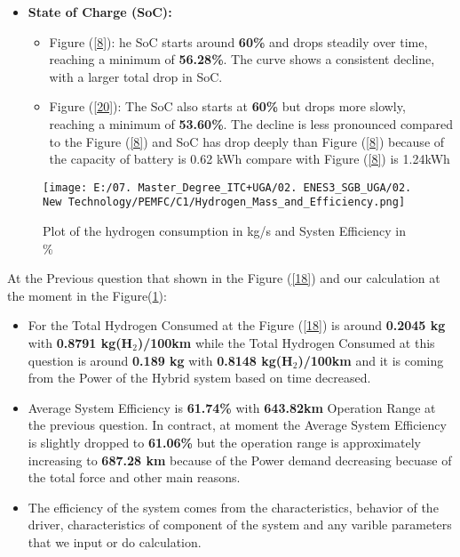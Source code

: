 \documentclass[12pt,a4paper]{article}
\numberwithin{equation}{section}
\begin{document}
\begin{itemize}
	\item \textbf{State of Charge (SoC):}
	\begin{itemize}
		\item {Figure (\ref{8}):} he SoC starts around \textbf{60\%} and drops steadily over time, reaching a minimum of \textbf{56.28\%}. The curve shows a consistent decline, with a larger total drop in SoC.
		\item {Figure (\ref{20}):} The SoC also starts at \textbf{60\%} but drops more slowly, reaching a minimum of \textbf{53.60\%}. The decline is less pronounced compared to the Figure (\ref{8}) and SoC has drop deeply than Figure (\ref{8}) because of the capacity of battery is 0.62 kWh compare with Figure (\ref{8}) is 1.24kWh
	\end{itemize}

	
\end{itemize}

\begin{figure}[h]
	\centering 
	\texttt{[image: E:/07. Master\_Degree\_ITC+UGA/02. ENES3\_SGB\_UGA/02. New Technology/PEMFC/C1/Hydrogen\_Mass\_and\_Efficiency.png]}
	\caption{\small {Plot of the hydrogen consumption in kg/s and Systen Efficiency in \%}}
	\label{21}
\end{figure}

At the Previous question that shown in the Figure (\ref{18}) and our calculation at the moment in the Figure(\ref{21}):

\begin{itemize}
	\item For the Total Hydrogen Consumed at the Figure (\ref{18}) is around \textbf{0.2045 kg} with \textbf{0.8791 kg(H$_2$)/100km} while the Total Hydrogen Consumed at this question is around \textbf{0.189 kg} with \textbf{0.8148 kg(H$_2$)/100km} and it is coming from the Power of the Hybrid system based on time decreased.
	
	\item Average System Efficiency is \textbf{61.74\%} with \textbf{643.82km} Operation Range at the previous question. In contract, at moment the Average System Efficiency is slightly dropped to \textbf{61.06\%} but the operation range is approximately increasing to \textbf{687.28 km} because of the Power demand decreasing becuase of the total force and other main reasons.
	\item The efficiency of the system comes from the characteristics, behavior of the driver, characteristics of component of the system and any varible parameters that we input or do calculation.
	
\end{itemize} 
\end{document}
